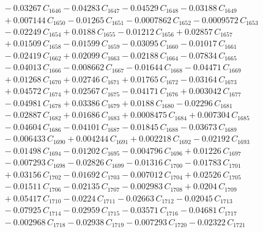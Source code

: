 \documentclass[a4paper,11pt]{article}
\begin{document}
\begin{align}
&\quad - 0.03267\,C_{1646} - 0.04283\,C_{1647} - 0.04529\,C_{1648} - 0.03188\,C_{1649} \nonumber\\
&\quad + 0.007144\,C_{1650} - 0.01265\,C_{1651} - 0.0007862\,C_{1652} - 0.0009572\,C_{1653} \nonumber\\
&\quad - 0.02249\,C_{1654} + 0.0188\,C_{1655} - 0.01212\,C_{1656} + 0.02857\,C_{1657} \nonumber\\
&\quad + 0.01509\,C_{1658} - 0.01599\,C_{1659} - 0.03095\,C_{1660} - 0.01017\,C_{1661} \nonumber\\
&\quad - 0.02419\,C_{1662} + 0.02099\,C_{1663} - 0.02188\,C_{1664} - 0.07834\,C_{1665} \nonumber\\
&\quad - 0.04013\,C_{1666} - 0.008662\,C_{1667} - 0.01644\,C_{1668} - 0.04471\,C_{1669} \nonumber\\
&\quad + 0.01268\,C_{1670} + 0.02746\,C_{1671} + 0.01765\,C_{1672} - 0.03164\,C_{1673} \nonumber\\
&\quad + 0.04572\,C_{1674} + 0.02567\,C_{1675} - 0.04171\,C_{1676} + 0.003042\,C_{1677} \nonumber\\
&\quad - 0.04981\,C_{1678} + 0.03386\,C_{1679} + 0.0188\,C_{1680} - 0.02296\,C_{1681} \nonumber\\
&\quad - 0.02887\,C_{1682} + 0.01686\,C_{1683} + 0.0008475\,C_{1684} + 0.007304\,C_{1685} \nonumber\\
&\quad - 0.04604\,C_{1686} - 0.04101\,C_{1687} - 0.01845\,C_{1688} - 0.03673\,C_{1689} \nonumber\\
&\quad - 0.006433\,C_{1690} + 0.004244\,C_{1691} + 0.002218\,C_{1692} - 0.02192\,C_{1693} \nonumber\\
&\quad - 0.01498\,C_{1694} - 0.01202\,C_{1695} - 0.004796\,C_{1696} + 0.01226\,C_{1697} \nonumber\\
&\quad - 0.007293\,C_{1698} - 0.02826\,C_{1699} - 0.01316\,C_{1700} - 0.01783\,C_{1701} \nonumber\\
&\quad + 0.03156\,C_{1702} - 0.01692\,C_{1703} - 0.007012\,C_{1704} + 0.02526\,C_{1705} \nonumber\\
&\quad - 0.01511\,C_{1706} - 0.02135\,C_{1707} - 0.002983\,C_{1708} + 0.0204\,C_{1709} \nonumber\\
&\quad + 0.05417\,C_{1710} - 0.0224\,C_{1711} - 0.02663\,C_{1712} - 0.02045\,C_{1713} \nonumber\\
&\quad - 0.07925\,C_{1714} - 0.02959\,C_{1715} - 0.03571\,C_{1716} - 0.04681\,C_{1717} \nonumber\\
&\quad - 0.002968\,C_{1718} - 0.02938\,C_{1719} - 0.007293\,C_{1720} - 0.02322\,C_{1721} \nonumber\\

\end{align}
\end{document}
